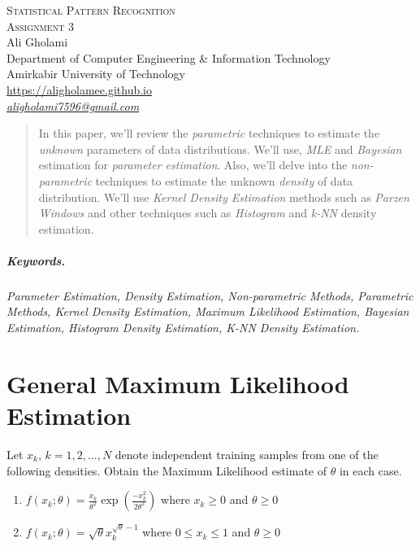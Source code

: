 \documentclass[12pt]{article}
\numberwithin{equation}{section}
\numberwithin{table}{section}
\numberwithin{figure}{section}
\begin{document}

\begin{center}
\textsc{\Large Statistical Pattern Recognition} \\[2pt]
	\textsc{\large Assignment 3}\\
	\vspace{0.5cm}
  Ali Gholami \\[6pt]
  Department of Computer Engineering \& Information Technology\\
  Amirkabir University of Technology  \\[6pt]
  \def\UrlFont{\em}
  \url{https://aligholamee.github.io}\\
    \href{mailto:aligholami7596@gmail.com}{\textit{aligholami7596@gmail.com}}
\end{center}

\begin{abstract}
In this paper, we'll review the \textit{parametric} techniques to estimate the \textit{unknown} parameters of data distributions. We'll use, \textit{MLE} and \textit{Bayesian} estimation for \textit{parameter estimation}. Also, we'll delve into the \textit{non-parametric} techniques to estimate the unknown \textit{density} of data distribution. We'll use \textit{Kernel Density Estimation} methods such as \textit{Parzen Windows} and other techniques such as \textit{Histogram} and \textit{k-NN} density estimation.
\end{abstract}

\subparagraph{Keywords.} \textit{Parameter Estimation, Density Estimation, Non-parametric Methods, Parametric Methods, Kernel Density Estimation, Maximum Likelihood Estimation, Bayesian Estimation, Histogram Density Estimation, K-NN Density Estimation.}

\section{General Maximum Likelihood Estimation}
Let ${x_k}$, $k = 1, 2, ..., N$ denote independent training samples from one of the following densities. Obtain the Maximum Likelihood estimate of $\theta$ in each case.
\begin{enumerate}[label=(\alph*)]
	\item $ f(x_k;\theta) = \frac{x_k}{\theta^2}\exp(\frac{-x_k^2}{2\theta^2}) $ where $x_k \geq 0$ and $\theta \ge 0$
	\item $ f(x_k;\theta) = \sqrt{\theta}x_k^{\sqrt{\theta} - 1}$ where $0 \leq x_k \leq 1$ and $ \theta \ge 0$
\end{enumerate}
\end{document}
